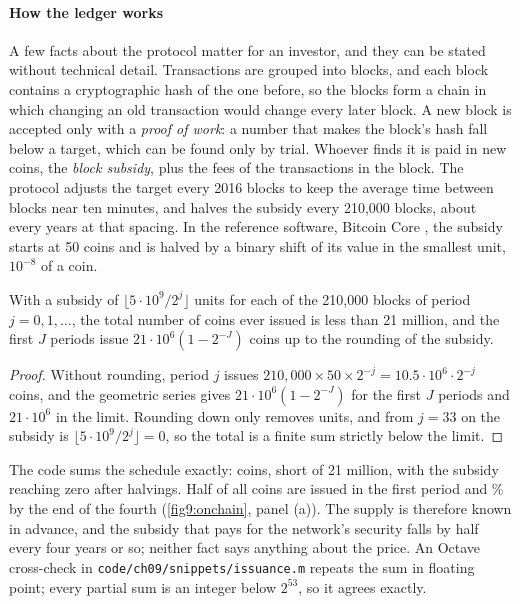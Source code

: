 \begin{chapterrefs}
\paragraph{How the ledger works}
A few facts about the protocol matter for an investor, and they can be stated without technical
detail. Transactions are grouped into blocks, and each block contains a cryptographic hash of the one
before, so the blocks form a chain in which changing an old transaction would change every later
block. A new block is accepted only with a \emph{proof of work}: a number that makes the block's hash
fall below a target, which can be found only by trial. Whoever finds it is paid in new coins, the
\emph{block subsidy}, plus the fees of the transactions in the block. The protocol adjusts the target
every 2016 blocks to keep the average time between blocks near ten minutes, and halves the subsidy
every 210,000 blocks, about every \ocEpochYears{} years at that spacing. In the reference software,
Bitcoin Core \parencite{bitcoincore}, the subsidy starts at 50 coins and is halved by a binary shift
of its value in the smallest unit, $10^{-8}$ of a coin.

\begin{proposition}\label{prop9:supply}
With a subsidy of $\lfloor5\cdot10^9/2^j\rfloor$ units for each of the 210,000 blocks of period
$j=0,1,\dots$, the total number of coins ever issued is less than 21 million, and the first $J$ periods
issue $21\cdot10^6(1-2^{-J})$ coins up to the rounding of the subsidy.
\end{proposition}

\begin{proof}
Without rounding, period $j$ issues $210{,}000\times50\times2^{-j}=10.5\cdot10^6\cdot2^{-j}$ coins, and the
geometric series gives $21\cdot10^6(1-2^{-J})$ for the first $J$ periods and $21\cdot10^6$ in the limit.
Rounding down only removes units, and from $j=33$ on the subsidy is $\lfloor5\cdot10^9/2^{j}\rfloor=0$, so the total
is a finite sum strictly below the limit.
\end{proof}

The code sums the schedule exactly: \ocSupply{} coins, \ocShortfall{} short of 21 million, with the subsidy
reaching zero after \ocHalvings{} halvings. Half of all coins are issued in the first period and
\ocShareFour\% by the end of the fourth (\cref{fig9:onchain}, panel (a)). The supply is therefore known in
advance, and the subsidy that pays for the network's security falls by half every four years or so;
neither fact says anything about the price.
An Octave cross-check in \texttt{code/ch09/snippets/issuance.m} repeats the sum in floating point;
every partial sum is an integer below $2^{53}$, so it agrees exactly.


\end{chapterrefs}
